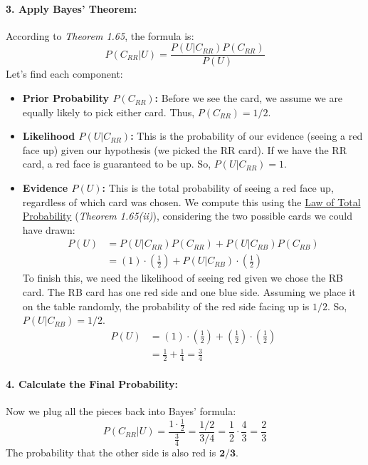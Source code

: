 \documentclass[11pt,a4paper]{article}
\theoremstyle{tutorstyle}
\newcommand{\concept}[2]{\hyperlink{#1}{#2}}
\begin{document}
\paragraph{3. Apply Bayes' Theorem:}
According to \textit{Theorem 1.65}, the formula is:
\[
P(C_{RR} | U) = \frac{P(U | C_{RR}) P(C_{RR})}{P(U)}
\]
Let's find each component:
\begin{itemize}[leftmargin=*]
    \item \textbf{Prior Probability $P(C_{RR})$:} Before we see the card, we assume we are equally likely to pick either card. Thus, $P(C_{RR}) = 1/2$.

    \item \textbf{Likelihood $P(U | C_{RR})$:} This is the probability of our evidence (seeing a red face up) given our hypothesis (we picked the RR card). If we have the RR card, a red face is guaranteed to be up. So, $P(U | C_{RR}) = 1$.

    \item \textbf{Evidence $P(U)$:} This is the total probability of seeing a red face up, regardless of which card was chosen. We compute this using the \concept{concept_totalprob}{Law of Total Probability} (\textit{Theorem 1.65(ii)}), considering the two possible cards we could have drawn:
    \begin{align*}
        P(U) &= P(U | C_{RR})P(C_{RR}) + P(U | C_{RB})P(C_{RB}) \\
             &= (1) \cdot \left(\frac{1}{2}\right) + P(U | C_{RB}) \cdot \left(\frac{1}{2}\right)
    \end{align*}
    To finish this, we need the likelihood of seeing red given we chose the RB card. The RB card has one red side and one blue side. Assuming we place it on the table randomly, the probability of the red side facing up is $1/2$. So, $P(U | C_{RB}) = 1/2$.
    \begin{align*}
        P(U) &= (1) \cdot \left(\frac{1}{2}\right) + \left(\frac{1}{2}\right) \cdot \left(\frac{1}{2}\right) \\
             &= \frac{1}{2} + \frac{1}{4} = \frac{3}{4}
    \end{align*}
\end{itemize}

\paragraph{4. Calculate the Final Probability:}
Now we plug all the pieces back into Bayes' formula:
\[
P(C_{RR} | U) = \frac{1 \cdot \frac{1}{2}}{\frac{3}{4}} = \frac{1/2}{3/4} = \frac{1}{2} \cdot \frac{4}{3} = \frac{2}{3}
\]
The probability that the other side is also red is $\mathbf{2/3}$.
\end{document}
